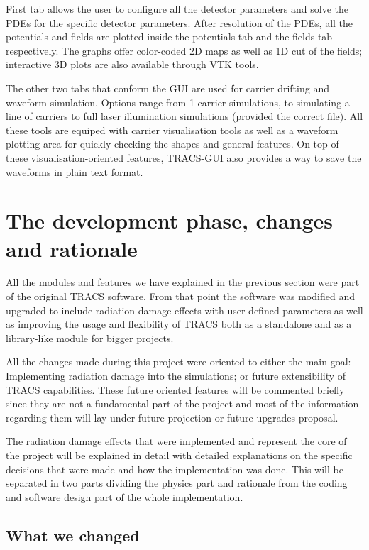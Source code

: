 First tab allows the user to configure all the detector parameters and solve the PDEs for the specific detector parameters. After resolution of the PDEs, all the potentials and fields are plotted inside the potentials tab and the fields tab respectively. The graphs offer color-coded 2D maps as well as 1D cut of the fields; interactive 3D plots are also available through VTK tools.

The other two tabs that conform the GUI are used for carrier drifting and waveform simulation. Options range from 1 carrier simulations, to simulating a line of carriers to full laser illumination simulations (provided the correct file). All these tools are equiped with carrier visualisation tools as well as a waveform plotting area for quickly checking the shapes and general features. On top of these visualisation-oriented features, TRACS-GUI also provides a way to save the waveforms in plain text format.

\section{The development phase, changes and rationale} %
\label{sec:werk}

All the modules and features we have explained in the previous section were part of the original TRACS software. From that point the software was modified and upgraded to include radiation damage effects  with user defined parameters as well as improving the usage and flexibility of TRACS both as a standalone and as a library-like module for bigger projects.

All the changes made during this project were oriented to either the main goal: Implementing radiation damage into the simulations; or future extensibility of TRACS capabilities. These future oriented features will be commented briefly since they are not a fundamental part of the project and most of the information regarding them will lay under future projection or future upgrades proposal.

The radiation damage effects that were implemented and represent the core of the project will be explained in detail with detailed explanations on the specific decisions that were made and how the implementation was done. This will be separated in two parts dividing the physics part and rationale from the coding and software design part of the whole implementation.

\subsection{What we changed}

